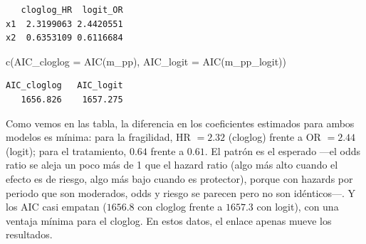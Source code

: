\documentclass[
  letterpaper,
  DIV=11,
  numbers=noendperiod]{scrartcl}
\newenvironment{Shaded}{\begin{snugshade}}{\end{snugshade}}
\newcommand{\AttributeTok}[1]{\textcolor[rgb]{0.40,0.45,0.13}{#1}}
\newcommand{\FunctionTok}[1]{\textcolor[rgb]{0.28,0.35,0.67}{#1}}
\newcommand{\NormalTok}[1]{\textcolor[rgb]{0.00,0.23,0.31}{#1}}
\begin{document}
\begin{verbatim}
   cloglog_HR  logit_OR
x1  2.3199063 2.4420551
x2  0.6353109 0.6116684
\end{verbatim}

\begin{Shaded}
\begin{Highlighting}[]
\FunctionTok{c}\NormalTok{(}\AttributeTok{AIC\_cloglog =} \FunctionTok{AIC}\NormalTok{(m\_pp), }\AttributeTok{AIC\_logit =} \FunctionTok{AIC}\NormalTok{(m\_pp\_logit))}
\end{Highlighting}
\end{Shaded}

\begin{verbatim}
AIC_cloglog   AIC_logit 
   1656.826    1657.275 
\end{verbatim}

Como vemos en las tabla, la diferencia en los coeficientes estimados
para ambos modelos es mínima: para la fragilidad, HR \(=2.32\) (cloglog)
frente a OR \(=2.44\) (logit); para el tratamiento, \(0.64\) frente a
\(0.61\). El patrón es el esperado ---el odds ratio se aleja un poco más
de 1 que el hazard ratio (algo más alto cuando el efecto es de riesgo,
algo más bajo cuando es protector), porque con hazards por periodo que
son moderados, odds y riesgo se parecen pero no son idénticos---. Y los
AIC casi empatan (\(1656.8\) con cloglog frente a \(1657.3\) con logit),
con una ventaja mínima para el cloglog. En estos datos, el enlace apenas
mueve los resultados.
\end{document}
